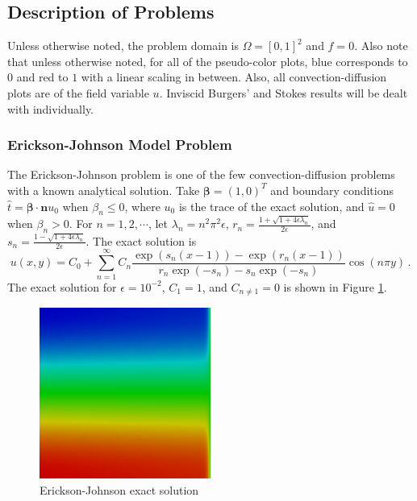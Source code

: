 \documentclass[letterpaper]{article}
\def\bbeta{\boldsymbol\beta}
\begin{document}
\subsection{Description of Problems}\label{sec:problemDescriptions}
Unless otherwise noted, the problem domain is $\Omega=[0,1]^2$ and $f=0$. Also
note that unless otherwise noted, for all of the
pseudo-color plots, blue corresponds to $0$ and red to $1$ with a linear
scaling in between. Also, all convection-diffusion plots are of the field variable $u$.
Inviscid Burgers' and Stokes results will be dealt with individually.

\subsubsection{Erickson-Johnson Model Problem}
The Erickson-Johnson problem is one of the few convection-diffusion problems
with a known analytical solution. Take
$\bbeta=(1,0)^T$ and boundary conditions $\hat t=\bbeta\cdot\mathbf{n} u_0$ when
$\beta_n\le0$, where $u_0$ is the trace of the exact solution, and $\hat u=0$
when $\beta_n>0$. For
$n=1,2,\cdots$, let
$\lambda_n=n^2\pi^2\epsilon$,
$r_n=\frac{1+\sqrt{1+4\epsilon\lambda_n}}{2\epsilon}$, and
$s_n=\frac{1-\sqrt{1+4\epsilon\lambda_n}}{2\epsilon}$. The exact solution
is
\begin{equation}
u(x,y)=C_0+\sum_{n=1}^\infty C_n\frac{\exp(s_n(x-1))-\exp(r_n(x-1))}
{r_n\exp(-s_n)-s_n\exp(-s_n)}\cos(n\pi y)\,.
\label{eq:ericksonExact}
\end{equation}
The exact solution for $\epsilon=10^{-2}$, $C_1=1$, and $C_{n\neq1}=0$ is
shown in Figure \ref{fig:erickson}.

\begin{figure}[p]
\centering
\includegraphics[width=0.5\textwidth]{figs/Erickson/exact.png}
\caption{Erickson-Johnson exact solution}
\label{fig:erickson}
\end{figure}
\end{document}
